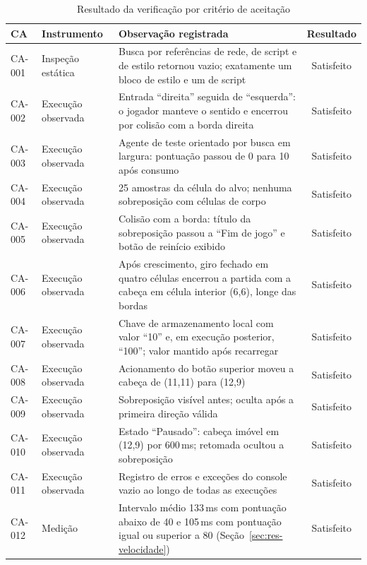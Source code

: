 \begin{table}[htb]
	\caption{Resultado da verificação por critério de aceitação}
	\label{tab:ca-resultados}
	\centering
	\scriptsize
	\begin{tabularx}{\textwidth}{@{}p{1.3cm} p{2.1cm} X c@{}}
		\toprule
		\textbf{CA} & \textbf{Instrumento} & \textbf{Observação registrada} & \textbf{Resultado} \\
		\midrule
		CA-001 & Inspeção estática & Busca por referências de rede, de script e de estilo retornou vazio; exatamente um bloco de estilo e um de script & Satisfeito \\
		\addlinespace
		CA-002 & Execução observada & Entrada ``direita'' seguida de ``esquerda'': o jogador manteve o sentido e encerrou por colisão com a borda direita & Satisfeito \\
		\addlinespace
		CA-003 & Execução observada & Agente de teste orientado por busca em largura: pontuação passou de 0 para 10 após consumo & Satisfeito \\
		\addlinespace
		CA-004 & Execução observada & 25 amostras da célula do alvo; nenhuma sobreposição com células de corpo & Satisfeito \\
		\addlinespace
		CA-005 & Execução observada & Colisão com a borda: título da sobreposição passou a ``Fim de jogo'' e botão de reinício exibido & Satisfeito \\
		\addlinespace
		CA-006 & Execução observada & Após crescimento, giro fechado em quatro células encerrou a partida com a cabeça em célula interior (6,6), longe das bordas & Satisfeito \\
		\addlinespace
		CA-007 & Execução observada & Chave de armazenamento local com valor ``10'' e, em execução posterior, ``100''; valor mantido após recarregar & Satisfeito \\
		\addlinespace
		CA-008 & Execução observada & Acionamento do botão superior moveu a cabeça de (11,11) para (12,9) & Satisfeito \\
		\addlinespace
		CA-009 & Execução observada & Sobreposição visível antes; oculta após a primeira direção válida & Satisfeito \\
		\addlinespace
		CA-010 & Execução observada & Estado ``Pausado'': cabeça imóvel em (12,9) por 600\,ms; retomada ocultou a sobreposição & Satisfeito \\
		\addlinespace
		CA-011 & Execução observada & Registro de erros e exceções do console vazio ao longo de todas as execuções & Satisfeito \\
		\addlinespace
		CA-012 & Medição & Intervalo médio 133\,ms com pontuação abaixo de 40 e 105\,ms com pontuação igual ou superior a 80 (Seção~\ref{sec:res-velocidade}) & Satisfeito \\
		\bottomrule
	\end{tabularx}
\end{table}

